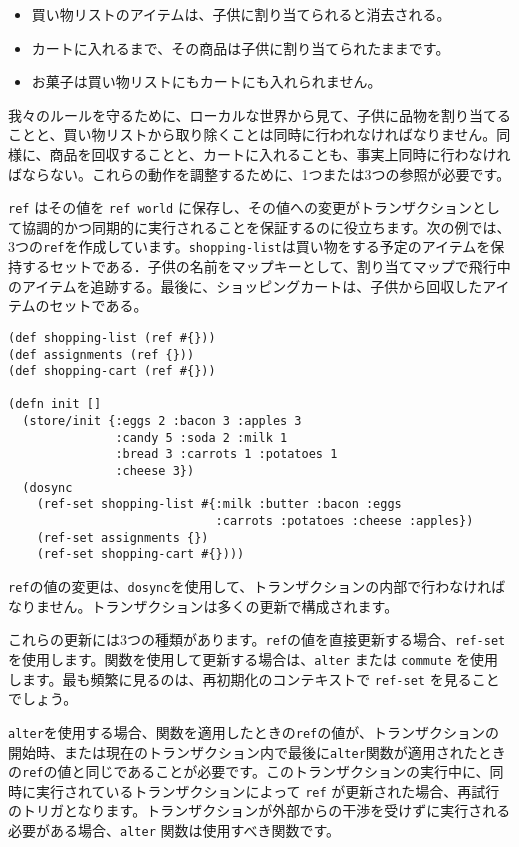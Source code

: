 \begin{itemize}
\item 買い物リストのアイテムは、子供に割り当てられると消去される。

\item カートに入れるまで、その商品は子供に割り当てられたままです。

\item お菓子は買い物リストにもカートにも入れられません。
\end{itemize}

我々のルールを守るために、ローカルな世界から見て、子供に品物を割り当てることと、買い物リストから取り除くことは同時に行われなければなりません。同様に、商品を回収することと、カートに入れることも、事実上同時に行わなければならない。これらの動作を調整するために、1つまたは3つの参照が必要です。

\texttt{ref} はその値を \texttt{ref world} に保存し、その値への変更がトランザクションとして協調的かつ同期的に実行されることを保証するのに役立ちます。次の例では、3つの\texttt{ref}を作成しています。\texttt{shopping-list}は買い物をする予定のアイテムを保持するセットである．子供の名前をマップキーとして、割り当てマップで飛行中のアイテムを追跡する。最後に、ショッピングカートは、子供から回収したアイテムのセットである。


\begin{lstlisting}[numbers=none]
(def shopping-list (ref #{}))
(def assignments (ref {}))
(def shopping-cart (ref #{}))

(defn init []
  (store/init {:eggs 2 :bacon 3 :apples 3
               :candy 5 :soda 2 :milk 1
               :bread 3 :carrots 1 :potatoes 1
               :cheese 3})
  (dosync
    (ref-set shopping-list #{:milk :butter :bacon :eggs
                             :carrots :potatoes :cheese :apples})
    (ref-set assignments {})
    (ref-set shopping-cart #{})))
\end{lstlisting}

\texttt{ref}の値の変更は、\texttt{dosync}を使用して、トランザクションの内部で行わなければなりません。トランザクションは多くの更新で構成されます。

これらの更新には3つの種類があります。\texttt{ref}の値を直接更新する場合、\texttt{ref-set}を使用します。関数を使用して更新する場合は、\texttt{alter} または \texttt{commute} を使用します。最も頻繁に見るのは、再初期化のコンテキストで \texttt{ref-set} を見ることでしょう。

\texttt{alter}を使用する場合、関数を適用したときの\texttt{ref}の値が、トランザクションの開始時、または現在のトランザクション内で最後に\texttt{alter}関数が適用されたときの\texttt{ref}の値と同じであることが必要です。このトランザクションの実行中に、同時に実行されているトランザクションによって \texttt{ref} が更新された場合、再試行のトリガとなります。トランザクションが外部からの干渉を受けずに実行される必要がある場合、\texttt{alter} 関数は使用すべき関数です。

